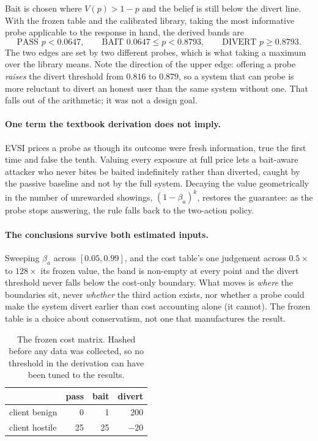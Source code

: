 \documentclass[runningheads]{llncs}
\begin{document}
Bait is chosen where $V(p) > 1 - p$ and the belief is still below the divert line.
With the frozen table and the calibrated library, taking the most informative probe
applicable to the response in hand, the derived bands are
%
\begin{equation}
\text{PASS } p < 0.0647, \qquad
\text{BAIT } 0.0647 \leq p < 0.8793, \qquad
\text{DIVERT } p \geq 0.8793 .
\end{equation}
%
The two edges are set by two different probes, which is what taking a maximum over
the library means. Note the direction of the upper edge: offering a probe
\emph{raises} the divert threshold from $0.816$ to $0.879$, so a system that can
probe is more reluctant to divert an honest user than the same system without one.
That falls out of the arithmetic; it was not a design goal.

\paragraph{One term the textbook derivation does not imply.}
EVSI prices a probe as though its outcome were fresh information, true the first
time and false the tenth. Valuing every exposure at full price lets a bait-aware
attacker who never bites be baited indefinitely rather than diverted, caught by the
passive baseline and not by the full system. Decaying the value geometrically in the
number of unrewarded showings, $(1-\beta_a)^k$, restores the guarantee: as the probe
stops answering, the rule falls back to the two-action policy.

\paragraph{The conclusions survive both estimated inputs.}
Sweeping $\beta_a$ across $[0.05, 0.99]$, and the cost table's one judgement across
$0.5\times$ to $128\times$ its frozen value, the band is non-empty at every point
and the divert threshold never falls below the cost-only boundary. What moves is
\emph{where} the boundaries sit, never \emph{whether} the third action exists, nor
whether a probe could make the system divert earlier than cost accounting alone (it
cannot). The frozen table is a choice about conservatism, not one that manufactures
the result.

\begin{table}[t]
\centering
\caption{The frozen cost matrix. Hashed before any data was collected, so no
threshold in the derivation can have been tuned to the results.}
\label{tab:costs}
\begin{tabular}{lrrr}
\toprule
 & pass & bait & divert \\
\midrule
client benign  & 0  & 1  & 200 \\
client hostile & 25 & 25 & $-20$ \\
\bottomrule
\end{tabular}
\end{table}
\end{document}
